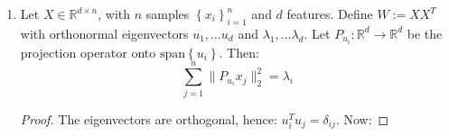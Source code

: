 \documentclass{article}
\begin{document}
\begin{enumerate}[label=\textbf{\large\arabic*)}]
\begin{proof}
 Since $C$ is PSD, it has an orthonormal eigenbasis $\left\{ v_i \right\}_{i=1}^{n}$, and we can write:
    \[
      C = \sum_{i=1}^{n} \lambda_i v_i  v_i ^{T}
    \]
   since $C$ is PSD, we have that $\lambda_i \geq 0$ for all $i$.  
  Let $u = \sum_{i=1}^{n} a_i v_i$ be a unit vector. 
  Such a representation exists and is unique because the eigenvectors form a basis. 
  Then:
\begin{align*}
      u ^{T} C u &= u ^{T} \big( C \sum_{i=1}^{n} a_i v_i \big) = u ^{T} \big( \sum_{j=1}^{n} \lambda_j v_j v_j ^{T} (\sum_{i=1}^{n} a_i v_i) \big)  \\
      &= u ^{T} \big( \sum_{j=1}^{n}  \lambda_j v_j \langle v_j, \sum_{i=1}^{n} a_i v_i \rangle \big) 
       = u ^{T} \big( \sum_{j=1}^{n} \lambda_j a_{j} v_j  \big) \tag{$v_i ^{T} v_j = \delta_{ij}$} \\
      &= (\sum_{i=1}^{n} a_i v_i)^{T} \big( \sum_{j=1}^{n} a_j \lambda_j v_j \big) 
      = \sum_{i=1}^{n} a_i \langle v_i, \sum_{j=1}^{n} a_j \lambda_j v_j \rangle \\
      &= \sum_{i=1}^{n} a_i a_i \lambda_i   \tag{ $v_i ^{T} v_j = \delta_{ij}$} \\
      & \leq \sum_{i=1}^{n} a_i ^2 \lambda_1  \tag{$\lambda_1$ is largest } \\
      &= \lambda_1 \lVert u \rVert  ^2  
      = \lambda_1 \tag{ $\lVert u \rVert ^2 = 1$} 
    \end{align*}
   so for every $u \in \mathbb{R}^{n}$, $u ^{T} C u \leq \lambda_1$
  and in particular:
  \begin{align*}
    v_1 ^{T} C v_1 = v_1 ^{T} \lambda_1 v_1 = \lambda_1 \lVert v_1 \rVert ^2 = \lambda_1
  \end{align*}
  i.e. the maximum is achieved by $v_1$, hence $v_1$ maximizes $\text{Var}(Su)$. 
    
  \end{proof}


  \item 
\begin{claim}
  Let $X \in \mathbb{R}^{d \times n}$, with $n$ samples $\left\{ x_i \right\}_{i=1}^{n}$ and $d$ features.  Define $W := X X ^{T}$ with orthonormal eigenvectors $u_1, \ldots u_{d}$ and $\lambda_1, \ldots \lambda_{d}$. Let $P_{u_i}: \mathbb{R}^{d} \to \mathbb{R}^{d}$ be the projection operator onto $\text{span} \left\{ u_i \right\}$. 
  Then:
  \[
    \sum_{j=1}^{n} \lVert P_{u_i} x_j \rVert ^2_2 = \lambda_{i}
  \]
\end{claim}
\begin{proof}
The eigenvectors are orthogonal, hence: $u_i^{T} u_j = \delta_{ij}$. Now:


\end{proof}
\end{enumerate}
\end{document}

